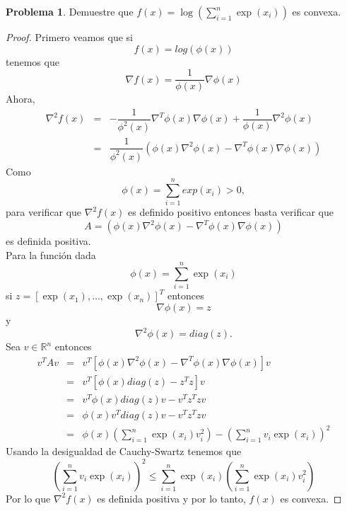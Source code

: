 \documentclass[12pt,letterpaper]{article}
\theoremstyle{definition}
\newtheorem{problm}{Problema}
\begin{document}
\begin{problm}
	Demuestre que $ f (x) = \log \left( \displaystyle \sum_{i = 1}^{n} \exp(x_i) \right) $ es convexa. 
	\begin{proof}
		Primero veamos que si
		\[ f(x) = log (\phi (x)) \]
		tenemos que
		\[ \nabla f(x) = \dfrac{1}{\phi (x) } \nabla \phi (x) \]
		Ahora,
		\begin{eqnarray*}
			\nabla^2 f(x) & = & - \dfrac{1}{\phi^2 (x)} \nabla^T \phi (x) \nabla \phi (x) + \dfrac{1}{\phi (x)} \nabla^2 \phi (x) \\
						  & = & \dfrac{1}{\phi^2 (x)} (\phi (x) \nabla^2 \phi(x) - \nabla^T \phi (x) \nabla \phi (x))
		\end{eqnarray*}
		Como 
		\[ \phi (x) = \sum_{i = 1}^n exp(x_i) > 0,\]
		para verificar que $ \nabla^2 f(x) $ es definido positivo entonces basta verificar que 
		\[  A = (\phi (x) \nabla^2 \phi(x) - \nabla^T \phi (x) \nabla \phi (x)) \]
		es definida positiva.
		\\
		Para la función dada
		\[ \phi (x) = \sum_{i = 1}^n \exp(x_i) \]
		si $ z = [\exp(x_1), \dots, \exp(x_n)]^T $ entonces
		\[ \nabla \phi (x) = z \] 
		y 
		\[ \nabla^2 \phi(x) = diag(z). \]
		Sea $ v\in\mathbb{R}^n $ entonces
		\begin{eqnarray*}
			v^T A v & = & v^T [\phi (x) \nabla^2 \phi(x) - \nabla^T \phi (x) \nabla \phi (x)]  v \\
			 & = & v^T [\phi (x) diag(z) - z^T z] v \\
			& = & v^T \phi (x) diag(z) v - v^T z^T z v \\
			& = & \phi (x) v^T  diag(z) v - v^T z^T z v \\
			& = & \phi (x) \left( \sum_{i = 1}^n \exp(x_i) v_i^2 \right) - \left( \sum_{i = 1}^n v_i \exp(x_i) \right)^2
		\end{eqnarray*}
		Usando la desigualdad de Cauchy-Swartz tenemos que
		\[ \left( \sum_{i = 1}^n v_i \exp(x_i) \right)^2 \leq  \sum_{i = 1}^n \exp(x_i) \left( \sum_{i = 1}^n \exp(x_i) v_i^2 \right)  \]
		Por lo que $ \nabla^2 f(x) $ es definida positiva y por lo tanto, $ f(x) $ es convexa.
	\end{proof}
\end{problm}
\end{document}
